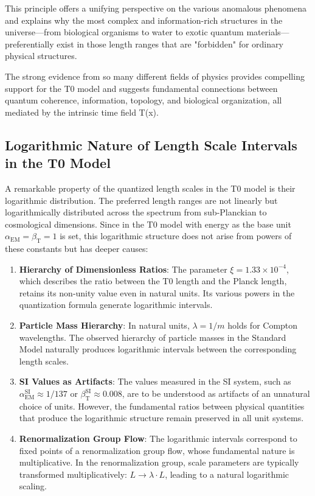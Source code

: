 \documentclass[12pt,a4paper]{article}
\newcommand{\Tfield}{T(x)}
\newcommand{\alphaEM}{\alpha_{\text{EM}}}
\newcommand{\betaT}{\beta_{\text{T}}}
\begin{document}
	This principle offers a unifying perspective on the various anomalous phenomena and explains why the most complex and information-rich structures in the universe—from biological organisms to water to exotic quantum materials—preferentially exist in those length ranges that are "forbidden" for ordinary physical structures.
	
	The strong evidence from so many different fields of physics provides compelling support for the T0 model and suggests fundamental connections between quantum coherence, information, topology, and biological organization, all mediated by the intrinsic time field \Tfield.
	
	\subsection{Logarithmic Nature of Length Scale Intervals in the T0 Model}
	\label{subsec:logarithmische_natur}
	
	A remarkable property of the quantized length scales in the T0 model is their logarithmic distribution. The preferred length ranges are not linearly but logarithmically distributed across the spectrum from sub-Planckian to cosmological dimensions. Since in the T0 model with energy as the base unit $\alphaEM = \betaT = 1$ is set, this logarithmic structure does not arise from powers of these constants but has deeper causes:
	
	\begin{enumerate}
		\item \textbf{Hierarchy of Dimensionless Ratios}: The parameter $\xi = 1.33 \times 10^{-4}$, which describes the ratio between the T0 length and the Planck length, retains its non-unity value even in natural units. Its various powers in the quantization formula generate logarithmic intervals.
		
		\item \textbf{Particle Mass Hierarchy}: In natural units, $\lambda = 1/m$ holds for Compton wavelengths. The observed hierarchy of particle masses in the Standard Model naturally produces logarithmic intervals between the corresponding length scales.
		
		\item \textbf{SI Values as Artifacts}: The values measured in the SI system, such as $\alphaEM^{\text{SI}} \approx 1/137$ or $\betaT^{\text{SI}} \approx 0.008$, are to be understood as artifacts of an unnatural choice of units. However, the fundamental ratios between physical quantities that produce the logarithmic structure remain preserved in all unit systems.
		
		\item \textbf{Renormalization Group Flow}: The logarithmic intervals correspond to fixed points of a renormalization group flow, whose fundamental nature is multiplicative. In the renormalization group, scale parameters are typically transformed multiplicatively: $L \to \lambda \cdot L$, leading to a natural logarithmic scaling.
	\end{enumerate}
	
\end{document}
